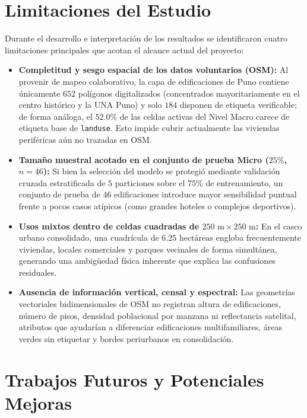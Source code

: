 \documentclass[11pt,a4paper]{article}
\begin{document}
\section{Limitaciones del Estudio}

Durante el desarrollo e interpretación de los resultados se identificaron cuatro limitaciones principales que acotan el alcance actual del proyecto:
\begin{itemize}[leftmargin=0.8cm, itemsep=2pt]
    \item \textbf{Completitud y sesgo espacial de los datos voluntarios (OSM):} Al provenir de mapeo colaborativo, la capa de edificaciones de Puno contiene únicamente $652$ polígonos digitalizados (concentrados mayoritariamente en el centro histórico y la UNA Puno) y solo $184$ disponen de etiqueta verificable; de forma análoga, el $52.0\%$ de las celdas activas del Nivel Macro carece de etiqueta base de \texttt{landuse}. Esto impide cubrir actualmente las viviendas periféricas aún no trazadas en OSM.
    \item \textbf{Tamaño muestral acotado en el conjunto de prueba Micro ($25\%$, $n=46$):} Si bien la selección del modelo se protegió mediante validación cruzada estratificada de $5$ particiones sobre el $75\%$ de entrenamiento, un conjunto de prueba de $46$ edificaciones introduce mayor sensibilidad puntual frente a pocos casos atípicos (como grandes hoteles o complejos deportivos).
    \item \textbf{Usos mixtos dentro de celdas cuadradas de $250\text{ m} \times 250\text{ m}$:} En el casco urbano consolidado, una cuadrícula de $6.25\text{ hectáreas}$ engloba frecuentemente viviendas, locales comerciales y parques vecinales de forma simultánea, generando una ambigüedad física inherente que explica las confusiones residuales.
    \item \textbf{Ausencia de información vertical, censal y espectral:} Las geometrías vectoriales bidimensionales de OSM no registran altura de edificaciones, número de pisos, densidad poblacional por manzana ni reflectancia satelital, atributos que ayudarían a diferenciar edificaciones multifamiliares, áreas verdes sin etiquetar y bordes periurbanos en consolidación.
\end{itemize}
\newpage
\section{Trabajos Futuros y Potenciales Mejoras}
\end{document}

